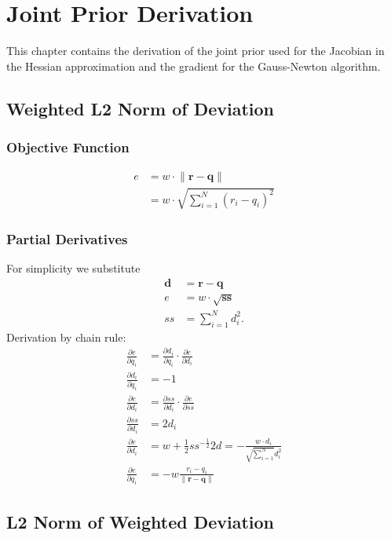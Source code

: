 \chapter{Joint Prior Derivation}

This chapter contains the derivation of the joint prior used for the Jacobian in the Hessian approximation and the gradient for the Gauss-Newton algorithm.

\section{Weighted L2 Norm of Deviation}

\subsection{Objective Function}
\begin{align}
e &= w \cdot \lVert \mathbf{r} - \mathbf{q} \rVert \\
&= w \cdot \sqrt{\sum_{i=1}^N (r_i - q_i)^2}
\end{align}

\subsection{Partial Derivatives}
For simplicity we substitute
\begin{align}
\mathbf{d} &= \mathbf{r} - \mathbf{q} \\
e &= w \cdot \sqrt{\mathbf{ss}} \\
ss &= \sum_{i=1}^N d_i^2 .
\end{align}
%
Derivation by chain rule:
\begin{align}
\frac{\partial e}{\partial q_i} &= \frac{\partial d_i}{\partial q_i} \cdot \frac{\partial e}{\partial d_i} \\
\frac{\partial d_i}{\partial q_i} &= -1 \nonumber\\
\frac{\partial e}{\partial d_i} &= \frac{\partial ss}{\partial d_i} \cdot \frac{\partial e}{\partial ss} \nonumber\\
\frac{\partial ss}{\partial d_i} &= 2d_i \nonumber\\
\frac{\partial e}{\partial d_i} &= w + \frac{1}{2} ss^{-\frac{1}{2}} 2 d = -\frac{w \cdot d_i}{\sqrt{\sum_{i=1}^N}d_i^2} \nonumber\\
\frac{\partial e}{\partial q_i} &= -w \frac{r_i - q_i}{\lVert \mathbf{r} - \mathbf{q} \rVert}
\end{align}


\section{L2 Norm of Weighted Deviation}

